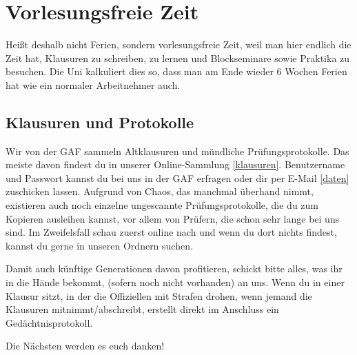 ﻿\chapter{Vorlesungsfreie Zeit}

Heißt deshalb nicht Ferien, sondern vorlesungsfreie Zeit, weil man hier endlich die Zeit hat, Klausuren zu schreiben, zu lernen und Blockseminare sowie Praktika zu besuchen. Die Uni kalkuliert dies so, dass man am Ende wieder 6 Wochen Ferien hat wie ein normaler Arbeitnehmer auch.

\section{Klausuren und Protokolle}
Wir von der GAF sammeln Altklausuren und mündliche Prüfungsprotokolle. Das meiste davon findest du in unserer Online-Sammlung \ref{klausuren}. Benutzername und Passwort kannst du bei uns in der GAF erfragen oder dir per E-Mail \ref{daten} zuschicken lassen.
Aufgrund von Chaos, das manchmal überhand nimmt, existieren auch noch einzelne ungescannte Prüfungsprotokolle, die du zum Kopieren ausleihen kannst, vor allem von Prüfern, die schon sehr lange bei uns sind. Im Zweifelsfall schau zuerst online nach und wenn du dort nichts findest, kannst du gerne in unseren Ordnern suchen.

Damit auch künftige Generationen davon profitieren, schickt bitte alles,
was ihr in die Hände bekommt, (sofern noch nicht vorhanden) an uns.
Wenn du in einer Klausur sitzt, in der die Offiziellen mit Strafen
drohen, wenn jemand die Klausuren mitnimmt/abschreibt, erstellt
direkt im Anschluss ein Gedächtnisprotokoll.

Die Nächsten werden es euch danken!

\begin{urlList}
\end{urlList}

